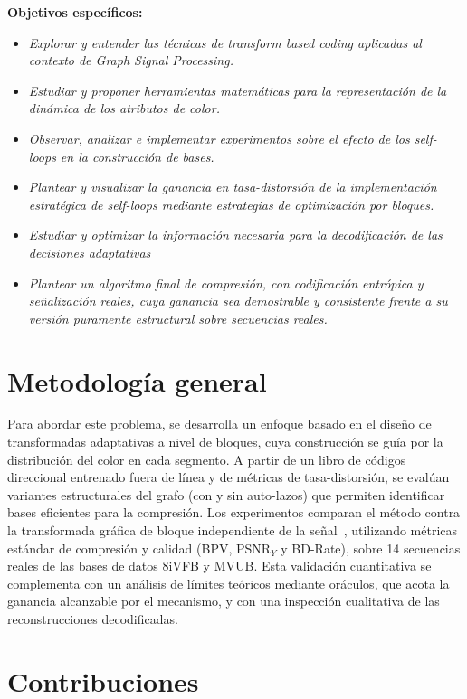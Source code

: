 \textbf{Objetivos específicos:}

\begin{itemize}
    \item \textit{Explorar y entender las técnicas de transform based coding aplicadas al contexto de Graph Signal Processing.}
    \item \textit{Estudiar y proponer herramientas matemáticas para la representación de la dinámica de los atributos de color.}
    \item \textit{Observar, analizar e implementar experimentos sobre el efecto de los self-loops en la construcción de bases.}
    \item \textit{Plantear y visualizar la ganancia en tasa-distorsión de la implementación estratégica de self-loops mediante estrategias de optimización por bloques.}
    \item \textit{Estudiar y optimizar la información necesaria para la decodificación de las decisiones adaptativas}
    \item \textit{Plantear un algoritmo final de compresión, con codificación entrópica y señalización reales, cuya ganancia sea demostrable y consistente frente a su versión puramente estructural sobre secuencias reales.}
\end{itemize}

\section{Metodología general}

Para abordar este problema, se desarrolla un enfoque basado en el diseño de transformadas adaptativas a nivel de bloques, cuya construcción se guía por la distribución del color en cada segmento. A partir de un libro de códigos direccional entrenado fuera de línea y de métricas de tasa-distorsión, se evalúan variantes estructurales del grafo (con y sin auto-lazos) que permiten identificar bases eficientes para la compresión. Los experimentos comparan el método contra la transformada gráfica de bloque independiente de la señal~\cite{zhang2014point}, utilizando métricas estándar de compresión y calidad (BPV, PSNR$_Y$ y BD-Rate), sobre 14 secuencias reales de las bases de datos 8iVFB y MVUB. Esta validación cuantitativa se complementa con un análisis de límites teóricos mediante oráculos, que acota la ganancia alcanzable por el mecanismo, y con una inspección cualitativa de las reconstrucciones decodificadas.

\section{Contribuciones}

